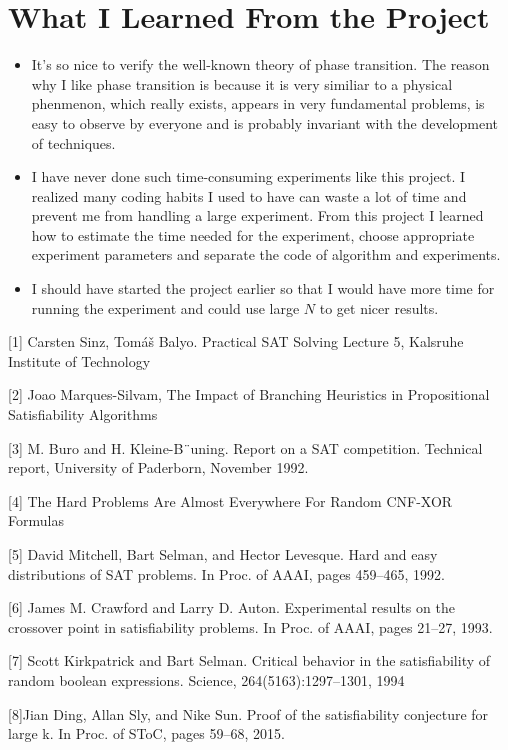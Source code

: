 \documentclass[12pt]{article}
\begin{document}
	\section{What I Learned From the Project}
	\begin{itemize}
		\item It's so nice to verify the well-known  theory of phase transition. The reason why I like phase transition is because it is very similiar to a physical phenmenon, which really exists, appears in very fundamental problems, is easy to observe by everyone and is probably invariant with the development of techniques. 
		\item I have never done  such time-consuming experiments like this project. I realized many coding habits I used to have can waste a lot of time and prevent me from handling a large experiment. From this project I learned how to estimate the time needed for the experiment,  choose  appropriate experiment parameters and separate the code of algorithm and experiments.
		\item I should have started the project earlier so that I would have more time for running the experiment and could use large $N$ to get nicer results.
	\end{itemize}


\renewcommand\refname{Reference}
  

[1] Carsten Sinz, Tomáš Balyo. Practical SAT Solving Lecture 5, Kalsruhe Institute of Technology

[2] Joao Marques-Silvam, The Impact of Branching Heuristics in Propositional Satisfiability Algorithms

[3] M. Buro and H. Kleine-B¨uning. Report on a SAT competition. Technical report,
University of Paderborn, November 1992.

[4] The Hard Problems Are Almost Everywhere For Random CNF-XOR Formulas 

[5] David Mitchell, Bart Selman, and Hector
Levesque. Hard and easy distributions of SAT problems. In Proc.
of AAAI, pages 459–465, 1992.

[6] James M. Crawford and Larry D. Auton. Experimental results on the crossover point in satisfiability
problems. In Proc. of AAAI, pages 21–27, 1993.

[7] Scott Kirkpatrick and Bart Selman. Critical behavior in the satisfiability of random boolean
expressions. Science, 264(5163):1297–1301, 1994

[8]Jian Ding, Allan Sly, and Nike Sun. Proof of
the satisfiability conjecture for large k. In Proc. of SToC, pages
59–68, 2015.
\end{document}
